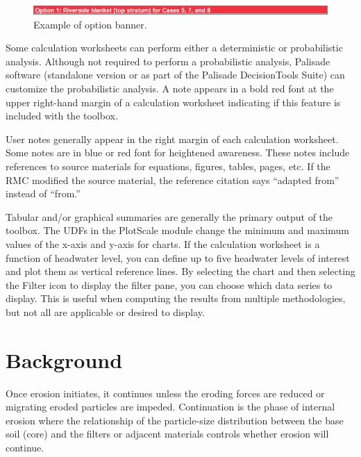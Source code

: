 \documentclass[
]{book}
\begin{document}
\begin{figure}

{\centering \includegraphics[width=1\linewidth]{images/figure7} 

}

\caption{Example of option banner.}\label{fig:figure-7}
\end{figure}

Some calculation worksheets can perform either a deterministic or probabilistic analysis. Although not required to perform a probabilistic analysis, Palisade \citet{RISK} software (standalone version or as part of the Palisade DecisionTools Suite) can customize the probabilistic analysis. A note appears in a bold red font at the upper right-hand margin of a calculation worksheet indicating if this feature is included with the toolbox.

User notes generally appear in the right margin of each calculation worksheet. Some notes are in blue or red font for heightened awareness. These notes include references to source materials for equations, figures, tables, pages, etc. If the RMC modified the source material, the reference citation says ``adapted from'' instead of ``from.''

Tabular and/or graphical summaries are generally the primary output of the toolbox. The UDFs in the PlotScale module change the minimum and maximum values of the x-axis and y-axis for charts. If the calculation worksheet is a function of headwater level, you can define up to five headwater levels of interest and plot them as vertical reference lines. By selecting the chart and then selecting the Filter icon to display the filter pane, you can choose which data series to display. This is useful when computing the results from multiple methodologies, but not all are applicable or desired to display.

\chapter{Background}\label{background}

Once erosion initiates, it continues unless the eroding forces are reduced or migrating eroded particles are impeded. Continuation is the phase of internal erosion where the relationship of the particle-size distribution between the base soil (core) and the filters or adjacent materials controls whether erosion will continue.
\end{document}
